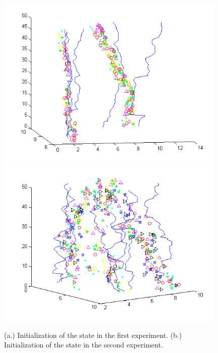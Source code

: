 \documentclass{article}
\begin{document}
\begin{figure}
\centering
{\includegraphics[width=110mm]{exp1_init_3.png}}
\hspace{8mm}
{\includegraphics[width=110mm]{exp2_init_5.png}}
\caption{(a.) Initialization of the state in the first experiment. (b.) Initialization of the state in the second experiment.}
\label{test}
\end{figure}
\end{document}
